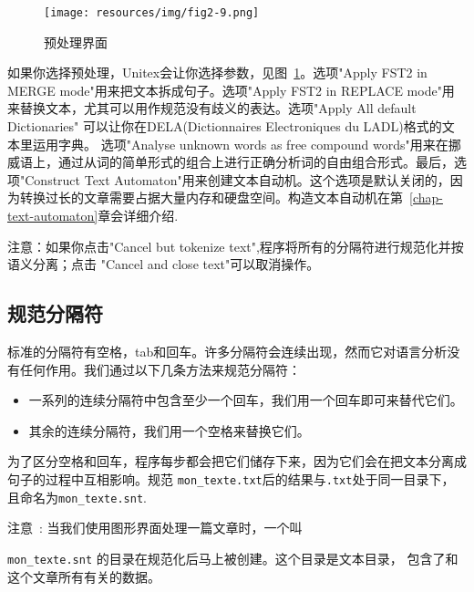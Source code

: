 \begin{figure}[!h]
\begin{center}
\texttt{[image: resources/img/fig2-9.png]}
\caption{预处理界面\label{fig-preprocessing-frame}}
\end{center}
\end{figure}

\bigskip
\noindent 
如果你选择预处理，Unitex会让你选择参数，见图~\ref{fig-preprocessing-frame}。选项"Apply FST2 in MERGE mode"用来把文本拆成句子。选项"Apply FST2 in REPLACE mode"用来替换文本，尤其可以用作规范没有歧义的表达。选项"Apply All default Dictionaries" 可以让你在DELA(Dictionnaires Electroniques du LADL)格式的文本里运用字典。 选项"Analyse unknown words as free 
compound words"用来在挪威语上，通过从词的简单形式的组合上进行正确分析词的自由组合形式。最后，选项"Construct Text Automaton"用来创建文本自动机。这个选项是默认关闭的，因为转换过长的文章需要占据大量内存和硬盘空间。构造文本自动机在第~\ref{chap-text-automaton}章会详细介绍.

\bigskip
\noindent 注意：如果你点击"Cancel but tokenize text",程序将所有的分隔符进行规范化并按语义分离；点击 "Cancel
and close text"可以取消操作。


\subsection{规范分隔符}
标准的分隔符有空格，tab和回车。许多分隔符会连续出现，然而它对语言分析没有任何作用。我们通过以下几条方法来规范分隔符：

\begin{itemize}
  \item 一系列的连续分隔符中包含至少一个回车，我们用一个回车即可来替代它们。
  \item 其余的连续分隔符，我们用一个空格来替换它们。
\end{itemize}

\bigskip
\noindent 
为了区分空格和回车，程序每步都会把它们储存下来，因为它们会在把文本分离成句子的过程中互相影响。规范 \verb+mon_texte.txt+后的结果与\verb+.txt+处于同一目录下，且命名为\verb+mon_texte.snt+. 

\bigskip
\noindent 注意~: 当我们使用图形界面处理一篇文章时，一个叫

\noindent \verb+mon_texte.snt+ 的目录在规范化后马上被创建。这个目录是文本目录， 包含了和这个文章所有有关的数据。



